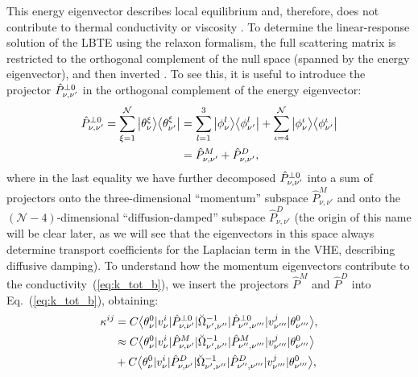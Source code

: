 \documentclass[
prb,
twocolumn,
superscriptaddress,
 amsmath,amssymb,
 aps,
longbibliography,
]{revtex4-2}
\begin{document}
This energy eigenvector describes local equilibrium \cite{allen_temperature_2018,Simoncelli2020,spohn_phonon_2006} and, therefore, does not contribute to thermal conductivity \cite{spohn_phonon_2006} or viscosity \cite{Simoncelli2020}. To determine the linear-response solution of the LBTE using the relaxon formalism, the full scattering matrix is restricted to the orthogonal complement of the null space (spanned by the energy eigenvector), and then inverted \cite{cepellotti_thermal_2016,Simoncelli2020}.
To see this, it is useful to introduce the projector $\hat P^{\perp \rm 0}_{\nu,\nu'}$ in the orthogonal complement of the energy eigenvector:
\begin{equation}
\begin{split}
\hat P^{\perp \rm 0}_{\nu,\nu'} = \sum_{\xi=1}^{\mathcal{N}}\big|
\theta^{\xi}_{\nu} \big> \big<\theta^{\xi}_{\nu'} \big|&=
\sum_{l=1}^3\big|\phi^{l}_{\nu} \big> \big<\phi^{l}_{\nu'}  \big|+
\sum_{\iota=4}^{\mathcal{N}}\big|\phi^{\iota}_{\nu} \big> \big<\phi^{\iota}_{\nu'} \big|\\
&=\hat P^{M}_{\nu,\nu'}+\hat P^{D}_{\nu,\nu'},
\label{eq:relation_projection}
\end{split}
\raisetag{5mm}
\end{equation}
where in the last equality we have further decomposed $\hat P^{\perp \rm 0}_{\nu,\nu'}$ into a sum of projectors onto the three-dimensional ``momentum'' subspace $\hat P^{M}_{\nu,\nu'}$ and onto the $(\mathcal{N}{-}4)$-dimensional ``diffusion-damped'' subspace $\hat P^{D}_{\nu,\nu'}$ (the origin of this name will be clear later, as we will see that the eigenvectors in this space always determine transport coefficients for the Laplacian term in the VHE, describing diffusive damping).
To understand how the momentum eigenvectors contribute to the conductivity~(\ref{eq:k_tot_b}), we insert the projectors $\hat P^{M}$ and $\hat P^{D}$ into Eq.~(\ref{eq:k_tot_b}), obtaining:
\begin{equation}
\begin{split}
  \kappa^{ij}
&= C \big<\theta^{0}_{\nu} | v^i_{\nu} |\hat P^{\perp \rm 0}_{\nu,\nu'}| {{\breve{\Omega}}^{-1}_{\nu',\nu''}} |\hat P^{\perp \rm 0}_{\nu'',\nu'''} | {v}^j_{\nu'''} | \theta^{0}_{\nu'''}\big>,\\
&\approx C \big<\theta^{0}_{\nu} | v^i_{\nu} |\hat P^{M}_{\nu,\nu'}| {{\breve{\Omega}}^{-1}_{\nu',\nu''}} |\hat P^{M}_{\nu'',\nu'''} | {v}^j_{\nu'''} | \theta^{0}_{\nu'''}\big>\\
&+ C \big<\theta^{0}_{\nu} | v^i_{\nu} |\hat P^{D}_{\nu,\nu'}| {{\breve{\Omega}}^{-1}_{\nu',\nu''}} |\hat P^{D}_{\nu'',\nu'''} | {v}^j_{\nu'''} | \theta^{0}_{\nu'''}\big>,
\end{split}
\label{eq:k_tot_c}
\end{equation}
\end{document}
